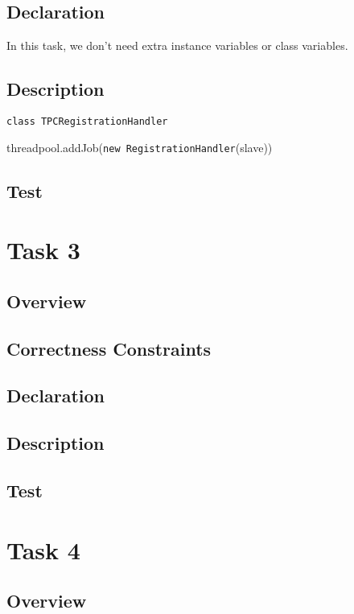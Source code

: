 \documentclass{article}
\begin{document}
\subsection{Declaration}
In this task, we don't need extra instance variables or class variables.
\subsection{Description}
\begin{algorithm}
	\caption{\texttt{class TPCRegistrationHandler}}
	\begin{algorithmic}
			\State threadpool.addJob(\texttt{new RegistrationHandler}(slave))
		\EndProcedure
			\State
		\EndProcedure
	\end{algorithmic}
\end{algorithm}
\subsection{Test}

\section{Task 3}
\subsection{Overview}
\subsection{Correctness Constraints}
\subsection{Declaration}
\subsection{Description}
\subsection{Test}

\section{Task 4}
\subsection{Overview}
\end{document}
